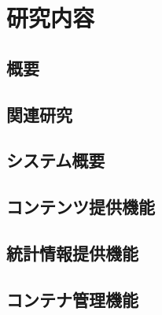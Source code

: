 \section{研究内容}\label{se3}

\subsection{概要}
\subsection{関連研究}
\subsection{システム概要}
\subsection{コンテンツ提供機能}
\subsection{統計情報提供機能}
\subsection{コンテナ管理機能}
